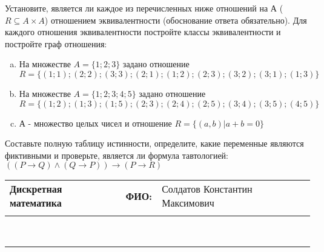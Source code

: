 \documentclass[10pt]{exam}
\newcommand{\class}{Дискретная математика}
\newcommand{\examdate}{}
\begin{document}
\begin{questions}
\question
Установите, является ли каждое из перечисленных ниже отношений на А ($R \subseteq A \times A$) отношением эквивалентности (обоснование ответа обязательно). Для каждого отношения эквивалентности постройте классы 
эквивалентности и постройте граф отношения:
\begin{enumerate} [a)]\setcounter{enumi}{0}
\item На множестве $A = \{1; 2; 3\}$ задано отношение $R = \{(1; 1); (2; 2); (3; 3); (2; 1); (1; 2); (2; 3); (3; 2); (3; 1); (1; 3)\}$
\item На множестве $A = \{1; 2; 3; 4; 5\}$ задано отношение $R = \{(1; 2); (1; 3); (1; 5); (2; 3); (2; 4); (2; 5); (3; 4); (3; 5); (4; 5)\}$
\item А - множество целых чисел и отношение $R = \{(a,b)|a + b = 0\}$
\end{enumerate}\question Составьте полную таблицу истинности, определите, какие переменные являются фиктивными и проверьте, является ли формула тавтологией:
$(( P \rightarrow Q) \land (Q \rightarrow P)) \rightarrow (P \rightarrow R)$

\end{questions}
\newpage
\begin{flushright}
\begin{tabular}{p{2.8in} r l}
\textbf{\class} & \textbf{ФИО:} &Солдатов Константин Максимович
\\

\textbf{\examdate} &&\\
\end{tabular}\\
\end{flushright}
\rule[1ex]{\textwidth}{.1pt}
\end{document}
